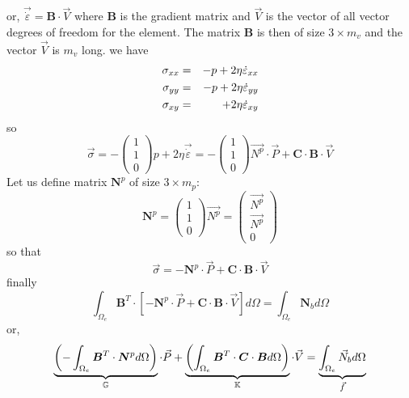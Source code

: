 or, $\vec{\dot \varepsilon}={\bm B}\cdot {\vec V}$ where ${\bm B}$ is the gradient 
matrix and ${\vec V}$ is the vector of all vector degrees of freedom for the 
element. The matrix ${\bm B}$ is then of size $3\times m_v$ and the vector
${\vec V}$ is $m_v$ long.
we have 
\begin{eqnarray}
\sigma_{xx}&=&-p + 2\eta \dot\varepsilon_{xx} \\
\sigma_{yy}&=&-p + 2\eta \dot\varepsilon_{yy} \\
\sigma_{xy}&=& \hspace{5.5mm} + 2\eta \dot\varepsilon_{xy} 
\end{eqnarray}
so
\begin{equation}
\vec{\sigma} 
=-\left( 
\begin{array}{c}
1 \\ 1 \\ 0 
\end{array}
\right) p+ 2 \eta \vec{\dot\varepsilon}
=
- \left(
\begin{array}{c}
1 \\ 1 \\ 0 
\end{array}
\right)
\vec{N^p} \cdot {\vec P}  + 
{\bm C} \cdot  {\bm B}\cdot {\vec V}
\end{equation}
Let us define matrix ${\bm N}^p$ of size $3\times m_p$:
\begin{equation}
{\bm N}^p=
\left(
\begin{array}{c}
1 \\ 1 \\ 0
\end{array}
\right)
\vec{N^p} 
=
\left(
\begin{array}{c}
\vec{N^p} \\
\vec{N^p} \\
0
\end{array}
\right)
\end{equation}
so that
\begin{equation}
\vec{\sigma} 
= - {\bm N}^p
 \cdot {\vec P}  + 
{\bm C} \cdot  {\bm B}\cdot {\vec V}
\end{equation}
finally
\begin{equation}
\int_{\Omega_e} {\bm B}^T \cdot 
[
- {\bm N}^p  \cdot {\vec P}  + {\bm C} \cdot  {\bm B}\cdot {\vec V}
]
d\Omega
=
\int_{\Omega_e} {\bm N}_b d\Omega 
\end{equation}
or,
\begin{equation}
\underbrace{\left(-\int_{\Omega_e} {\bm B}^T \cdot 
{\bm N}^p  
d\Omega \right)}_{{\mathbb{G}}} \cdot {\vec P} 
+
\underbrace{
\left(
\int_{\Omega_e} {\bm B}^T \cdot 
{\bm C} \cdot  {\bm B}
d\Omega
\right)}_{{\mathbb{K}}}
\cdot {\vec V}
=
\underbrace{\int_{\Omega_e} {\vec N}_b d\Omega }_{\vec f}
\end{equation}
